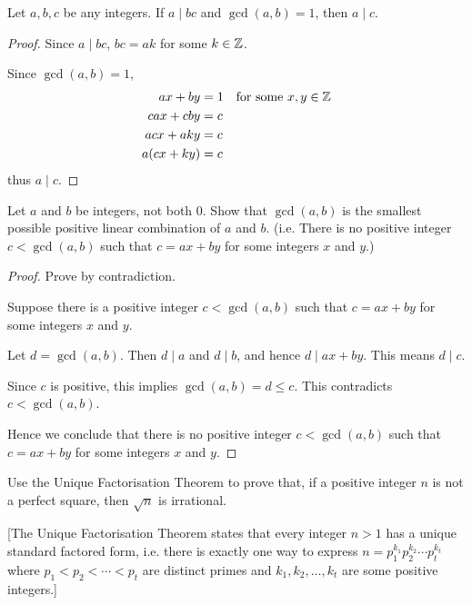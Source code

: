 \begin{prbm}
Let $a,b,c$ be any integers. If $a\mid bc$ and $\gcd(a,b)=1$, then $a\mid c$.
\end{prbm}

\begin{proof}
Since $a\mid bc$, $bc=ak$ for some $k\in\mathbb Z$.

Since $\gcd(a,b)=1$,
\begin{align*}
ax+by&=1 \quad \text{for some } x,y\in\mathbb Z \\
cax+cby&=c \\
acx+aky&=c \\
a(cx+ky)&=c
\end{align*}
thus $a\mid c$.
\end{proof}

\begin{prbm}
Let $a$ and $b$ be integers, not both $0$. Show that $\gcd(a,b)$ is the smallest possible positive linear combination of $a$ and $b$. (i.e. There is no positive integer $c<\gcd(a,b)$ such that $c=ax+by$ for some integers $x$ and $y$.)
\end{prbm}

\begin{proof}
Prove by contradiction.

Suppose there is a positive integer $c<\gcd(a,b)$ such that $c=ax+by$ for some integers $x$ and $y$.

Let $d=\gcd(a,b)$. Then $d\mid a$ and $d\mid b$, and hence $d\mid ax+by$. This means $d\mid c$.

Since $c$ is positive, this implies $\gcd(a,b)=d\le c$. This contradicts $c<\gcd(a,b)$.

Hence we conclude that there is no positive integer $c<\gcd(a,b)$ such that $c=ax+by$ for some integers $x$ and $y$.
\end{proof}

\begin{prbm}
Use the Unique Factorisation Theorem to prove that, if a positive integer $n$ is not a perfect square, then $\sqrt{n}$ is irrational.

[The Unique Factorisation Theorem states that every integer $n>1$ has a unique standard factored form, i.e. there is exactly one way to express $n=p_1^{k_1}p_2^{k_2}\cdots p_t^{k_t}$ where $p_1<p_2<\cdots<p_t$ are distinct primes and $k_1,k_2,\dots,k_t$ are some positive integers.]
\end{prbm}


